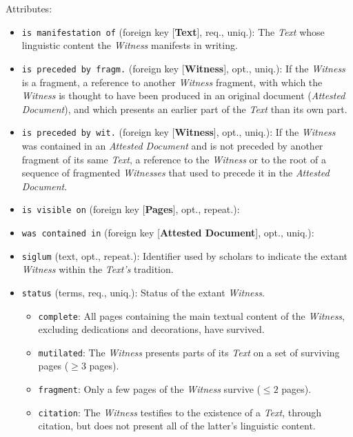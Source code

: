 \vspace{1em}
\noindent Attributes:
\begin{itemize}
    \item \texttt{is manifestation of} (foreign key [\textbf{Text}], req., uniq.): The \textit{Text} whose linguistic content the \textit{Witness} manifests in writing.
    \item \texttt{is preceded by fragm.} (foreign key [\textbf{Witness}], opt., uniq.): If the \textit{Witness} is a fragment, a reference to another \textit{Witness} fragment, with which the \textit{Witness} is thought to have been produced in an original document (\textit{Attested Document}), and which presents an earlier part of the \textit{Text} than its own part.
    \item \texttt{is preceded by wit.} (foreign key [\textbf{Witness}], opt., uniq.): If the \textit{Witness} was contained in an \textit{Attested Document} and is not preceded by another fragment of its same \textit{Text}, a reference to the \textit{Witness} or to the root of a sequence of fragmented \textit{Witnesses} that used to precede it in the \textit{Attested Document}.
    \item \texttt{is visible on} (foreign key [\textbf{Pages}], opt., repeat.): 
    \item \texttt{was contained in} (foreign key [\textbf{Attested Document}], opt., uniq.): 
    \item \texttt{siglum} (text, opt., repeat.): Identifier used by scholars to indicate the extant \textit{Witness} within the \textit{Text's} tradition.
    \item \texttt{status} (terms, req., uniq.): Status of the extant \textit{Witness}.
    \begin{itemize}
        \item \texttt{complete}: All pages containing the main textual content of the \textit{Witness}, excluding dedications and decorations, have survived.
        \item \texttt{mutilated}: The \textit{Witness} presents parts of its \textit{Text} on a set of surviving pages ($ \geq 3 $ pages).
        \item \texttt{fragment}: Only a few pages of the \textit{Witness} survive ($ \leq 2 $ pages). 
        \item \texttt{citation}: The \textit{Witness} testifies to the existence of a \textit{Text}, through citation, but does not present all of the latter's linguistic content.
    \end{itemize}

\end{itemize}

